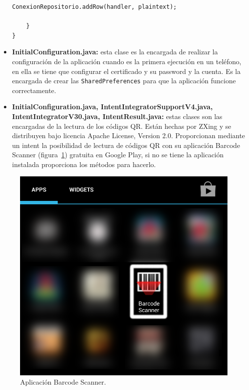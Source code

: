 \begin{itemize}
\begin{lstlisting}[style=Java]
		ConexionRepositorio.addRow(handler, plaintext);
		
	}
}
\end{lstlisting} 

\item \textbf{InitialConfiguration.java:} esta clase es la encargada de realizar la configuración de la aplicación cuando es la primera ejecución en un teléfono, en ella se tiene que configurar el certificado y su password y la cuenta. Es la encargada de crear las \lstinline{SharedPreferences} para que la aplicación funcione correctamente.

\item \textbf{InitialConfiguration.java, IntentIntegratorSupportV4.java, IntentIntegratorV30.java, IntentResult.java:} estas clases son las encargadas de la lectura de los códigos QR. Están hechas por ZXing y se distribuyen bajo licencia Apache License, Version 2.0. Proporcionan mediante un intent la posibilidad de lectura de códigos QR con su aplicación Barcode Scanner (figura~\ref{fig:barcodeScanner}) gratuita en Google Play, si no se tiene la aplicación instalada proporciona los métodos para hacerlo.

\end{itemize}

\begin{figure}[h]
  \centering
    \includegraphics[scale=0.3]{./Android/imagenes/barcodeScanner.png}
  \caption{Aplicación Barcode Scanner.}
  \label{fig:barcodeScanner}
\end{figure}

